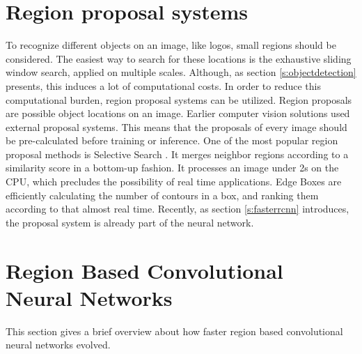 \section{Region proposal systems}\label{s:rpn}
To recognize different objects on an image, like logos, small regions should be considered. The easiest way to search for these locations is the exhaustive sliding window search, applied on multiple scales. Although, as section \ref{s:objectdetection} presents, this induces a lot of computational costs. In order to reduce this computational burden, region proposal systems can be utilized. Region proposals are possible object locations on an image.
\bigbreak
Earlier computer vision solutions used external proposal systems. This means that the proposals of every image should be pre-calculated before training or inference. One of the most popular region proposal methods is Selective Search \cite{Uijlings13}. It merges neighbor regions according to a similarity score in a bottom-up fashion. It processes an image under 2s on the CPU, which precludes the possibility of real time applications. Edge Boxes \cite{edge-boxes-locating-object-proposals-from-edges} are efficiently calculating the number of contours in a box, and ranking them according to that almost real time. Recently, as section \ref{s:fasterrcnn} introduces, the proposal system is already part of the neural network.
\bigbreak
\section{Region Based Convolutional Neural Networks}\label{s:rcnn}

This section gives a brief overview about how faster region based convolutional neural networks evolved.
\bigbreak
